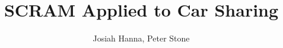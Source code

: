 \documentclass[letterpaper]{article}
\begin{document}
%
\title{SCRAM Applied to Car Sharing}
\author{Josiah Hanna, Peter Stone}
\maketitle



\end{document}
